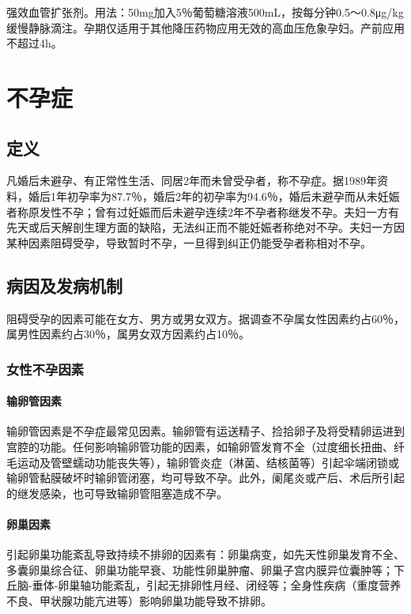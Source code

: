 强效血管扩张剂。用法：50mg加入5％葡萄糖溶液500mL，按每分钟0.5～0.8μg/kg缓慢静脉滴注。孕期仅适用于其他降压药物应用无效的高血压危象孕妇。产前应用不超过4h。

\section{不孕症}

\subsection{定义}

凡婚后未避孕、有正常性生活、同居2年而未曾受孕者，称不孕症。据1989年资料，婚后1年初孕率为87.7％，婚后2年的初孕率为94.6％，婚后未避孕而从未妊娠者称原发性不孕；曾有过妊娠而后未避孕连续2年不孕者称继发不孕。夫妇一方有先天或后天解剖生理方面的缺陷，无法纠正而不能妊娠者称绝对不孕。夫妇一方因某种因素阻碍受孕，导致暂时不孕，一旦得到纠正仍能受孕者称相对不孕。

\subsection{病因及发病机制}

阻碍受孕的因素可能在女方、男方或男女双方。据调查不孕属女性因素约占60％，属男性因素约占30％，属男女双方因素约占10％。

\subsubsection{女性不孕因素}
\paragraph{输卵管因素}

输卵管因素是不孕症最常见因素。输卵管有运送精子、捡拾卵子及将受精卵运进到宫腔的功能。任何影响输卵管功能的因素，如输卵管发育不全（过度细长扭曲、纤毛运动及管壁蠕动功能丧失等），输卵管炎症（淋菌、结核菌等）引起伞端闭锁或输卵管黏膜破坏时输卵管闭塞，均可导致不孕。此外，阑尾炎或产后、术后所引起的继发感染，也可导致输卵管阻塞造成不孕。
\paragraph{卵巢因素}

引起卵巢功能紊乱导致持续不排卵的因素有：卵巢病变，如先天性卵巢发育不全、多囊卵巢综合征、卵巢功能早衰、功能性卵巢肿瘤、卵巢子宫内膜异位囊肿等；下丘脑-垂体-卵巢轴功能紊乱，引起无排卵性月经、闭经等；全身性疾病（重度营养不良、甲状腺功能亢进等）影响卵巢功能导致不排卵。
